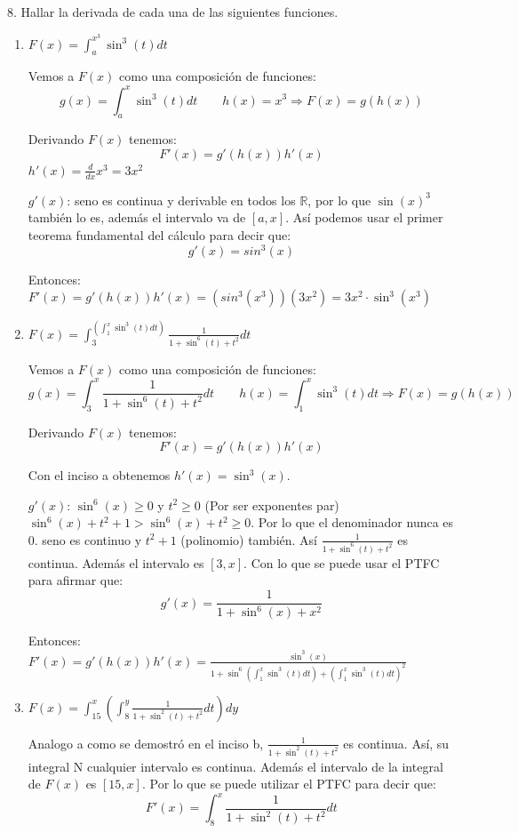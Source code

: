 \documentclass[12pt]{article}
\begin{document}
8. Hallar la derivada de cada una de las siguientes funciones.

\begin{enumerate}[\hspace{9px} a)]
    \item \(F(x)=\displaystyle\int_{a}^{x^3}\sin^3(t)dt\)\medskip
    
        Vemos a \(F(x)\) como una composici\'on de funciones:
        \[g(x)=\int_{a}^{x}\sin^3(t)dt \qquad h(x)=x^3 \Longrightarrow F(x)=g(h(x))\]

        Derivando \(F(x)\) tenemos:
        \[F'(x)=g'(h(x))h'(x)\]
        \(h'(x)=\frac{d}{dx}x^3=3x^2\)\medskip

        \(g'(x)\): seno es continua y derivable en todos los \(\mathbb{R}\), por lo que \(\sin(x)^3\) tambi\'en lo es, adem\'as el intervalo va de \([a,x]\). As\'i podemos usar el primer teorema fundamental del c\'alculo para decir que:
        \[g'(x) = sin^3(x)\]

        Entonces: \(F'(x)=g'(h(x))h'(x) = (sin^3(x^3))(3x^2) = 3x^2\cdot\sin^3(x^3)\)\medskip
        
    \item \(F(x)=\displaystyle\int_{3}^{\left(\displaystyle\int_{1}^{x}\sin^3(t)dt\right)}\frac{1}{1+\sin^6(t)+t^2}dt\)\medskip
    
        Vemos a \(F(x)\) como una composici\'on de funciones:
        \[g(x)=\int_{3}^{x}\frac{1}{1+\sin^6(t)+t^2}dt \qquad h(x)=\int_{1}^{x}\sin^3(t)dt \Longrightarrow F(x)=g(h(x))\]

        Derivando \(F(x)\) tenemos:
        \[F'(x)=g'(h(x))h'(x)\]

        Con el inciso a obtenemos \(h'(x) = \sin^3(x)\).\medskip

        \(g'(x)\): \(\sin^6(x)\geq0\) y \(t^2\geq0\) (Por ser exponentes par) \(\sin^6(x)+t^2+1>\sin^6(x)+t^2\geq0\). Por lo que el denominador nunca es 0. seno es continuo y \(t^2+1\) (polinomio) tambi\'en. As\'i \(\frac{1}{1+\sin^6(t)+t^2}\) es continua. Adem\'as el intervalo es \([3,x]\). Con lo que se puede usar el PTFC para afirmar que:
        \[g'(x) = \frac{1}{1+\sin^6(x)+x^2}\]

        Entonces: \(\displaystyle F'(x) = g'(h(x))h'(x) = \frac{\sin^3(x)}{1+\sin^6\left(\int_{1}^{x}\sin^3(t)dt\right)+\left(\int_{1}^{x}\sin^3(t)dt\right)^2}\)\medskip

    \item \(F(x)=\displaystyle\int_{15}^{x}\left(\int_{8}^{y}\frac{1}{1+\sin^2(t)+t^2}dt\right)dy\)\medskip
    
        Analogo a como se demostr\'o en el inciso b, \(\displaystyle\frac{1}{1+\sin^2(t)+t^2}\) es continua. As\'i, su integral N cualquier intervalo es continua. Adem\'as el intervalo de la integral de \(F(x)\) es \([15,x]\). Por lo que se puede utilizar el PTFC para decir que:
        \[F'(x) = \int_{8}^{x}\frac{1}{1+\sin^2(t)+t^2}dt\]

\end{enumerate}
\end{document}

